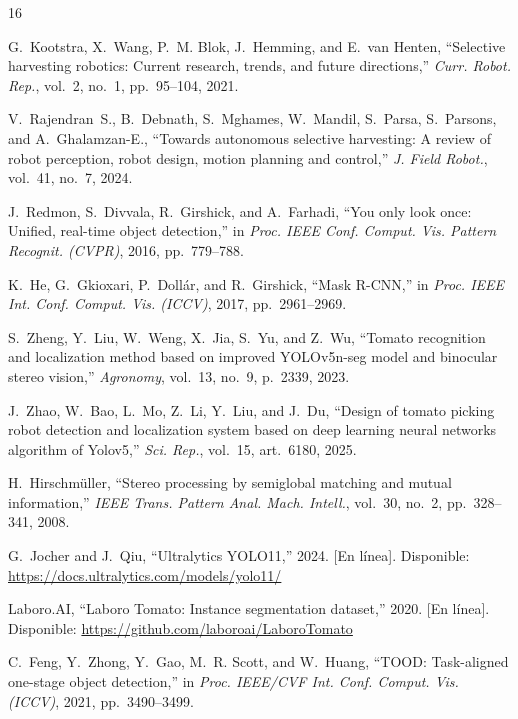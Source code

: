 \documentclass[conference]{IEEEtran}
\begin{document}
\begin{thebibliography}{16}

G.~Kootstra, X.~Wang, P.~M. Blok, J.~Hemming, and E.~van Henten, ``Selective harvesting robotics: Current research, trends, and future directions,'' \emph{Curr. Robot. Rep.}, vol.~2, no.~1, pp.~95--104, 2021.

V.~Rajendran~S., B.~Debnath, S.~Mghames, W.~Mandil, S.~Parsa, S.~Parsons, and A.~Ghalamzan-E., ``Towards autonomous selective harvesting: A review of robot perception, robot design, motion planning and control,'' \emph{J. Field Robot.}, vol.~41, no.~7, 2024.

J.~Redmon, S.~Divvala, R.~Girshick, and A.~Farhadi, ``You only look once: Unified, real-time object detection,'' in \emph{Proc. IEEE Conf. Comput. Vis. Pattern Recognit. (CVPR)}, 2016, pp.~779--788.

K.~He, G.~Gkioxari, P.~Dollár, and R.~Girshick, ``Mask R-CNN,'' in \emph{Proc. IEEE Int. Conf. Comput. Vis. (ICCV)}, 2017, pp.~2961--2969.

S.~Zheng, Y.~Liu, W.~Weng, X.~Jia, S.~Yu, and Z.~Wu, ``Tomato recognition and localization method based on improved YOLOv5n-seg model and binocular stereo vision,'' \emph{Agronomy}, vol.~13, no.~9, p.~2339, 2023.

J.~Zhao, W.~Bao, L.~Mo, Z.~Li, Y.~Liu, and J.~Du, ``Design of tomato picking robot detection and localization system based on deep learning neural networks algorithm of Yolov5,'' \emph{Sci. Rep.}, vol.~15, art.~6180, 2025.

H.~Hirschmüller, ``Stereo processing by semiglobal matching and mutual information,'' \emph{IEEE Trans. Pattern Anal. Mach. Intell.}, vol.~30, no.~2, pp.~328--341, 2008.

G.~Jocher and J.~Qiu, ``Ultralytics YOLO11,'' 2024. [En línea]. Disponible: \url{https://docs.ultralytics.com/models/yolo11/}

Laboro.AI, ``Laboro Tomato: Instance segmentation dataset,'' 2020. [En línea]. Disponible: \url{https://github.com/laboroai/LaboroTomato}

C.~Feng, Y.~Zhong, Y.~Gao, M.~R. Scott, and W.~Huang, ``TOOD: Task-aligned one-stage object detection,'' in \emph{Proc. IEEE/CVF Int. Conf. Comput. Vis. (ICCV)}, 2021, pp.~3490--3499.


\end{thebibliography}
\end{document}
